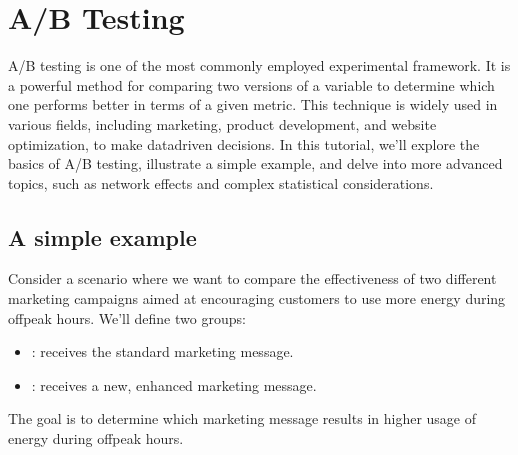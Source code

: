 \documentclass[letterpaper,10pt,english]{jupyterBook}
\begin{document}
\sphinxstepscope


\chapter{A/B Testing}
\label{\detokenize{notebooks/AB_testing:a-b-testing}}\label{\detokenize{notebooks/AB_testing::doc}}
\sphinxAtStartPar
A/B testing is one of the most commonly employed experimental framework. It is a powerful method for comparing two versions of a variable to determine which one performs better in terms of a given metric. This technique is widely used in various fields, including marketing, product development, and website optimization, to make data\sphinxhyphen{}driven decisions. In this tutorial, we’ll explore the basics of A/B testing, illustrate a simple example, and delve into more advanced topics, such as network effects and complex statistical considerations.


\section{A simple example}
\label{\detokenize{notebooks/AB_testing:a-simple-example}}
\sphinxAtStartPar
Consider a scenario where we want to compare the effectiveness of two different marketing campaigns aimed at encouraging customers to use more energy during off\sphinxhyphen{}peak hours. We’ll define two groups:
\begin{itemize}
\item {} 
\sphinxAtStartPar
{}: receives the standard marketing message.

\item {} 
\sphinxAtStartPar
{}: receives a new, enhanced marketing message.

\end{itemize}

\sphinxAtStartPar
The goal is to determine which marketing message results in higher usage of energy during off\sphinxhyphen{}peak hours.
\end{document}
